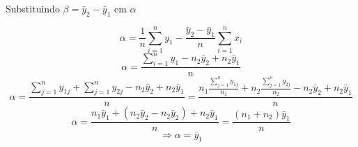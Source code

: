 \documentclass[11pt,]{article}
\begin{document}
Substituindo \(\beta = \bar y_{2} - \bar y_{1}\) em \(\alpha\)

\[\alpha= \frac{1}{n} \sum_{i=1}^n y_{1} - \frac{ \bar y_{2} - \bar y_{1}}{n} \sum_{i=1}^n x_{i}\]
\[\alpha= \frac {\sum_{i=1}^n y_{1} - n_{2} \bar y_{2} + n_{2} \bar y_{1}}{n}\]
\[\alpha=\frac {\sum_{j=1}^n y_{1j} + \sum_{j=1}^n y_{2j} - n_{2} \bar y_{2} + n_{2} \bar y_{1}}{n}=\frac {n_{1} \frac{\sum_{j=1}^n y_{1j}}{n_{1}} + n_{2} \frac{\sum_{j=1}^n y_{2j}}{n_{2}} - n_{2} \bar y_{2} + n_{2} \bar y_{1}}{n}\]
\[\alpha= \frac{n_{1} \bar y_{1} + (n_{2} \bar y_{2} - n_{2} \bar y_{2}) + n_{2} \bar y_{1}}{n}= \frac{(n_{1}+n_{2}) \bar y_{1}}{n}\]
\[\Rightarrow \alpha = \bar y_{1}\]


\newpage
\singlespacing 

\end{document}
